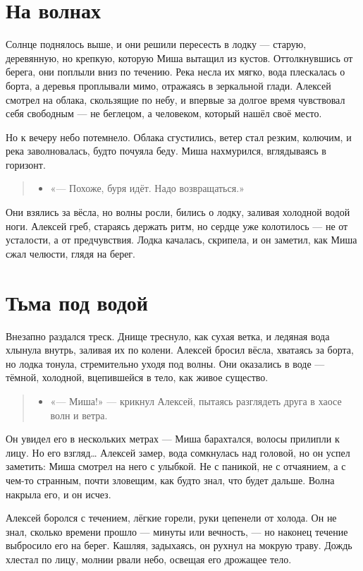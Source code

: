 \documentclass[12pt,a4paper]{book}
\newenvironment{dialogue}{\begin{quote}\itshape\begin{itemize}\item[]}{\end{itemize}\end{quote}}
\begin{document}
\section{На волнах}

Солнце поднялось выше, и они решили пересесть в лодку — старую, деревянную, но крепкую, которую Миша вытащил из кустов. Оттолкнувшись от берега, они поплыли вниз по течению. Река несла их мягко, вода плескалась о борта, а деревья проплывали мимо, отражаясь в зеркальной глади. Алексей смотрел на облака, скользящие по небу, и впервые за долгое время чувствовал себя свободным — не беглецом, а человеком, который нашёл своё место.

Но к вечеру небо потемнело. Облака сгустились, ветер стал резким, колючим, и река заволновалась, будто почуяла беду. Миша нахмурился, вглядываясь в горизонт.

\begin{dialogue}
«— Похоже, буря идёт. Надо возвращаться.»
\end{dialogue}

Они взялись за вёсла, но волны росли, бились о лодку, заливая холодной водой ноги. Алексей греб, стараясь держать ритм, но сердце уже колотилось — не от усталости, а от предчувствия. Лодка качалась, скрипела, и он заметил, как Миша сжал челюсти, глядя на берег.

\section{Тьма под водой}

Внезапно раздался треск. Днище треснуло, как сухая ветка, и ледяная вода хлынула внутрь, заливая их по колени. Алексей бросил вёсла, хватаясь за борта, но лодка тонула, стремительно уходя под волны. Они оказались в воде — тёмной, холодной, вцепившейся в тело, как живое существо.

\begin{dialogue}
«— Миша!» — крикнул Алексей, пытаясь разглядеть друга в хаосе волн и ветра.
\end{dialogue}

Он увидел его в нескольких метрах — Миша барахтался, волосы прилипли к лицу. Но его взгляд… Алексей замер, вода сомкнулась над головой, но он успел заметить: Миша смотрел на него с улыбкой. Не с паникой, не с отчаянием, а с чем-то странным, почти зловещим, как будто знал, что будет дальше. Волна накрыла его, и он исчез.

Алексей боролся с течением, лёгкие горели, руки цепенели от холода. Он не знал, сколько времени прошло — минуты или вечность, — но наконец течение выбросило его на берег. Кашляя, задыхаясь, он рухнул на мокрую траву. Дождь хлестал по лицу, молнии рвали небо, освещая его дрожащее тело.
\end{document}
